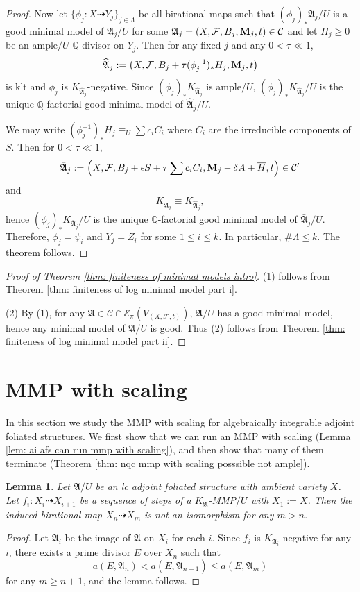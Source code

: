 \documentclass[12pt]{amsart}
\numberwithin{equation}{section}
\newcommand{\Mm}{{\bf{M}}}
\newcommand{\Qq}{\mathbb{Q}}
\newcommand{\Aa}{{\mathfrak{A}}}
\newcommand{\Ff}{\mathcal{F}}
\newtheorem{lem}[thm]{Lemma}
\theoremstyle{definition}
\theoremstyle{definition}
\theoremstyle{definition}
\begin{document}
\begin{proof}
    Now let $\{\phi_j: X\dashrightarrow Y_j\}_{j\in\Lambda}$ be all birational maps such that $(\phi_j)_*\Aa_j/U$ is a good minimal model of $\Aa_j/U$ for some $\Aa_j=(X,\Ff,B_j,\Mm_j,t)\in\mathcal{C}$ and let $H_j\geq 0$ be an ample$/U$ $\Qq$-divisor on $Y_j$. Then for any fixed $j$ and any $0<\tau\ll 1$, 
    $$\widehat{\Aa}_j:=\left(X,\Ff,B_j+\tau(\phi_j^{-1})_*H_j,\Mm_j,t\right)$$ is klt and $\phi_j$ is $K_{\widehat{\Aa}_j}$-negative. Since $(\phi_j)_*K_{\widehat{\Aa}_j}$ is ample$/U$, $(\phi_j)_*K_{\widehat{\Aa}_j}/U$ is the unique $\mathbb Q$-factorial good minimal model of $\widehat{\Aa}_j/U$. 

    We may write $(\phi_j^{-1})_*H_j\equiv_U\sum c_iC_i$ where $C_i$ are the irreducible components of $S$. Then for $0<\tau\ll 1$, 
    $$\bar\Aa_j:=\left(X,\Ff,B_j+\epsilon S+\tau\sum c_iC_i,\Mm_j-\delta A+\overline{H},t\right)\in\mathcal{C'}$$
and
$$K_{\bar\Aa_j}\equiv K_{\widehat{\Aa}_j},$$
hence $(\phi_j)_*K_{\bar{\Aa}_j}/U$ is the unique $\mathbb Q$-factorial good minimal model of $\bar{\Aa}_j/U$. Therefore, $\phi_j=\psi_i$ and $Y_j=Z_i$ for some $1\leq i\leq k$.
In particular, $\#\Lambda\leq k$. The theorem follows.
\end{proof}

\begin{proof}[Proof of Theorem \ref{thm: finiteness of minimal models intro}]
    (1) follows from Theorem \ref{thm: finiteness of log minimal model part i}. 
    
    (2) By (1), for any $\Aa\in\mathcal{C}\cap\mathcal{E}_{\pi}(V_{(X,\Ff,t)})$, $\Aa/U$ has a good minimal model, hence any minimal model of $\Aa/U$ is good. Thus (2) follows from Theorem \ref{thm: finiteness of log minimal model part ii}.
\end{proof}

\section{MMP with scaling}\label{sec: mmp with scaling}

In this section we study the MMP with scaling for algebraically integrable adjoint foliated structures. We first show that we can run an MMP with scaling (Lemma \ref{lem: ai afs can run mmp with scaling}), and then show that many of them terminate (Theorem \ref{thm: nqc mmp with scaling posssible not ample}).  

\begin{lem}\label{lem: non-isomorphism lemma}
    Let $\Aa/U$ be an lc adjoint foliated structure with ambient variety $X$. Let $f_i: X_i\dashrightarrow X_{i+1}$ be a sequence of steps of a $K_{\Aa}$-MMP$/U$ with $X_1:=X$. Then the induced birational map $X_n\dashrightarrow X_m$ is not an isomorphism for any $m>n$.
    \end{lem}
    \begin{proof}
        Let $\Aa_i$ be the image of $\Aa$ on $X_i$ for each $i$. Since $f_i$ is $K_{\Aa_i}$-negative for any $i$, there exists a prime divisor $E$ over $X_n$ such that
        $$a(E,\Aa_n)<a(E,\Aa_{n+1})\leq a(E,\Aa_m)$$
        for any $m\geq n+1$, and the lemma follows.
    \end{proof}
\end{document}
